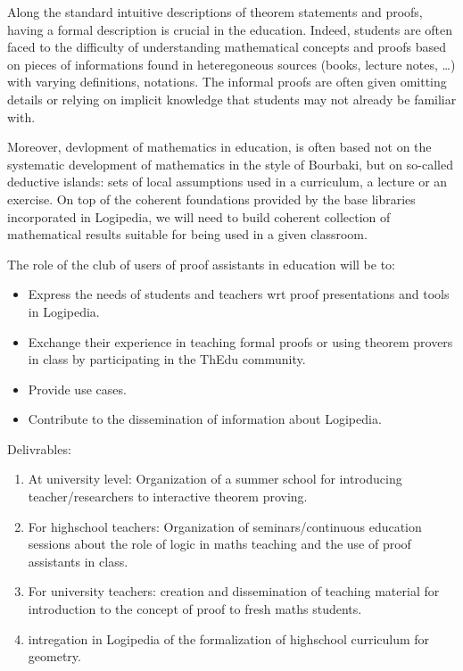 \begin{workpackage}[id=dissemination,wphases=0-48,type=MGT,
  short=Dissemination,%
  title={Dissemination, communication, and exploitation},
  lead=Inr,
  BolRM=3,
  InrRM=10]
\begin{tasklist}
\begin{task}[id=education,title=Expanding the use of Logipedia in education]
Along the standard intuitive descriptions of theorem statements and proofs, having a formal description is crucial in the education. Indeed, students are often faced to the difficulty of understanding mathematical concepts and proofs based on pieces of informations found in heteregoneous sources (books, lecture notes, \ldots) with varying definitions, notations. The informal proofs are often given omitting details or relying on implicit knowledge that students may not already be familiar with.

Moreover, devlopment of mathematics in education, is often based not on the systematic development of mathematics in the style of Bourbaki, but on so-called deductive islands: sets of local assumptions used in a curriculum, a lecture or an exercise.
On top of the coherent foundations provided by the base libraries incorporated in Logipedia, we will need to build coherent collection of mathematical results suitable for being used in a given classroom.

The role of the club of users of proof assistants in education will be to:
    \begin{itemize}
    \item Express the needs of students and teachers wrt proof
      presentations and tools in Logipedia.
    \item Exchange their experience in teaching formal proofs or using
      theorem provers in class by participating in the ThEdu community.
    \item Provide use cases.
    \item Contribute to the dissemination of information about Logipedia.
    \end{itemize}

Delivrables:
\begin{enumerate}
\item At university level: Organization of a summer school for introducing teacher/researchers to interactive theorem proving.
\item For highschool teachers: Organization of seminars/continuous education sessions about the role of logic in maths teaching and the use of proof assistants in class.
\item For university teachers: creation and dissemination of teaching material for introduction to the concept of proof to fresh maths students.
\item intregation in Logipedia of the formalization of highschool curriculum for geometry.
\end{enumerate}



\end{task}
\end{tasklist}
\end{workpackage}
